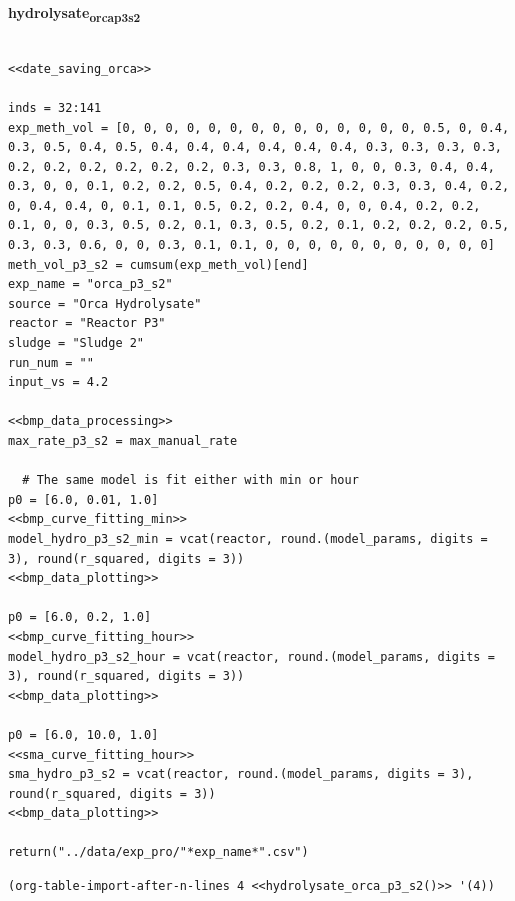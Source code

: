 \documentclass[11pt]{article}
\begin{document}
\textbf{hydrolysate\textsubscript{orca}\textsubscript{p3}\textsubscript{s2}}
\begin{verbatim}

<<date_saving_orca>>

inds = 32:141
exp_meth_vol = [0, 0, 0, 0, 0, 0, 0, 0, 0, 0, 0, 0, 0, 0, 0.5, 0, 0.4, 0.3, 0.5, 0.4, 0.5, 0.4, 0.4, 0.4, 0.4, 0.4, 0.4, 0.3, 0.3, 0.3, 0.3, 0.2, 0.2, 0.2, 0.2, 0.2, 0.2, 0.3, 0.3, 0.8, 1, 0, 0, 0.3, 0.4, 0.4, 0.3, 0, 0, 0.1, 0.2, 0.2, 0.5, 0.4, 0.2, 0.2, 0.2, 0.3, 0.3, 0.4, 0.2, 0, 0.4, 0.4, 0, 0.1, 0.1, 0.5, 0.2, 0.2, 0.4, 0, 0, 0.4, 0.2, 0.2, 0.1, 0, 0, 0.3, 0.5, 0.2, 0.1, 0.3, 0.5, 0.2, 0.1, 0.2, 0.2, 0.2, 0.5, 0.3, 0.3, 0.6, 0, 0, 0.3, 0.1, 0.1, 0, 0, 0, 0, 0, 0, 0, 0, 0, 0, 0] 
meth_vol_p3_s2 = cumsum(exp_meth_vol)[end]
exp_name = "orca_p3_s2"
source = "Orca Hydrolysate"
reactor = "Reactor P3"
sludge = "Sludge 2"
run_num = ""
input_vs = 4.2

<<bmp_data_processing>>
max_rate_p3_s2 = max_manual_rate

  # The same model is fit either with min or hour
p0 = [6.0, 0.01, 1.0]
<<bmp_curve_fitting_min>>
model_hydro_p3_s2_min = vcat(reactor, round.(model_params, digits = 3), round(r_squared, digits = 3))
<<bmp_data_plotting>>

p0 = [6.0, 0.2, 1.0]
<<bmp_curve_fitting_hour>>
model_hydro_p3_s2_hour = vcat(reactor, round.(model_params, digits = 3), round(r_squared, digits = 3))
<<bmp_data_plotting>>

p0 = [6.0, 10.0, 1.0]
<<sma_curve_fitting_hour>>
sma_hydro_p3_s2 = vcat(reactor, round.(model_params, digits = 3), round(r_squared, digits = 3))
<<bmp_data_plotting>>

return("../data/exp_pro/"*exp_name*".csv")

\end{verbatim}

\begin{verbatim}
(org-table-import-after-n-lines 4 <<hydrolysate_orca_p3_s2()>> '(4))
\end{verbatim}
\end{document}
